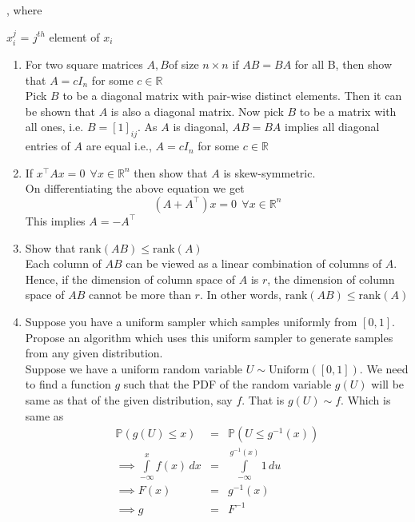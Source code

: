 \documentclass[11pt, twosides]{article}
\begin{document}
, where {$x_i^j$ = $j^{th}$ element of \textbf{$x_i$}
\begin{enumerate}
    \item For two square matrices $A, B$of size $n\times n$ if $AB = BA$ for all B, then show that $A = cI_n$ for some $c \in \mathbb{R}$\\
    \color{blue}
    Pick $B$ to be a diagonal matrix with pair-wise distinct elements. Then it can be shown that $A$ is also a diagonal matrix. Now pick $B$ to be a matrix with all ones, i.e. $B = [1]_{ij}$. As $A$ is diagonal, $AB=BA$ implies all diagonal entries of $A$ are equal i.e., $A = cI_n$ for some $c \in \mathbb{R}$
    \color{black}
    \item If $x^\top A x = 0\:\: \forall x \in \mathbb{R}^n$ then show that $A$ is skew-symmetric.\\
    \color{blue}
    On differentiating the above equation we get
    $$(A + A^\top)x = 0 \:\: \forall x \in \mathbb{R}^n$$
    This implies $A = -A^\top$
    \color{black}
    \item Show that $\text{rank}(AB) \leq \text{rank}(A)$\\
    \color{blue} Each column of $AB$ can be viewed as a linear combination of columns of $A$. Hence, if the dimension of column space of $A$ is $r$, the dimension of column space of $AB$ cannot be more than $r$. In other words,
    $\text{rank}(AB) \leq \text{rank}(A)$
    \color{black}
    \item Suppose you have a uniform sampler which samples uniformly from $[0, 1]$. Propose an algorithm which uses this uniform sampler to generate samples from any given distribution.\\
    \color{blue}
    Suppose we have a uniform random variable $U \sim \text{Uniform}([0, 1])$. We need to find a function $g$ such that the PDF of the random variable $g(U)$ will be same as that of the given distribution, say $f$. That is $g(U) \sim f$. Which is same as
    \begin{eqnarray*}
    \mathbb{P}(g(U) \leq x) &=& \mathbb{P}(U \leq g^{-1}(x))\\
    \implies \int \limits_{-\infty}^x f(x) \, dx &=& \int \limits_{-\infty}^{g^{-1}(x)} 1 \, du\\
    \implies F(x) &=& g^{-1}(x)\\
    \implies g &=& F^{-1}
    \end{eqnarray*}
    \color{black}
\end{enumerate}

}
\end{document}

